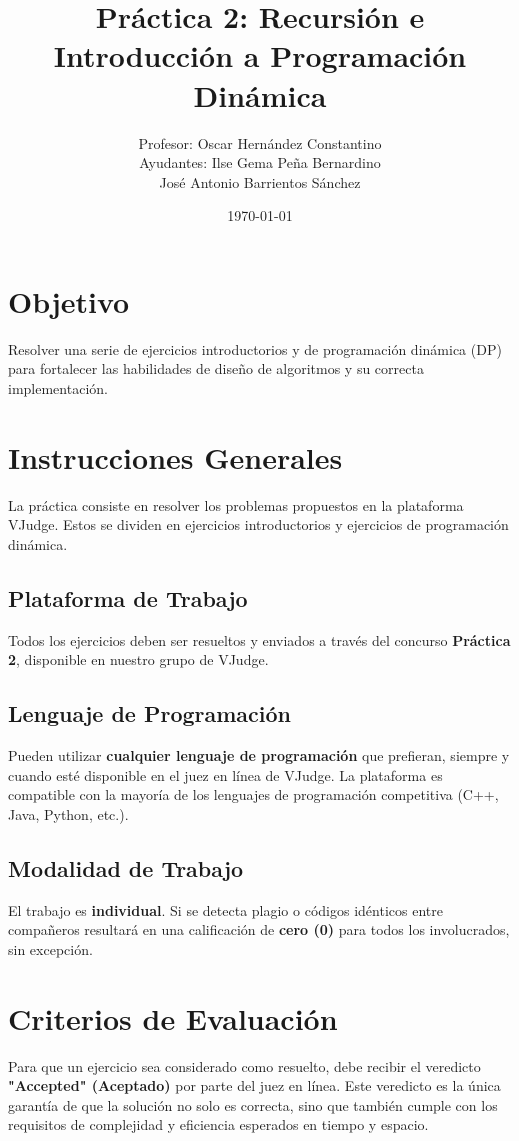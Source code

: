 \documentclass{article}
\title{\textbf{Práctica 2: Recursión e Introducción a Programación Dinámica}}
\author{Profesor: Oscar Hernández Constantino\\ Ayudantes: Ilse Gema Peña Bernardino \\ José Antonio Barrientos Sánchez}
\date{\today}
\begin{document}
\maketitle


\section*{Objetivo}
Resolver una serie de ejercicios introductorios y de programación dinámica (DP) para fortalecer las habilidades de diseño de algoritmos y su correcta implementación.

\section{Instrucciones Generales}

La práctica consiste en resolver los problemas propuestos en la plataforma VJudge. Estos se dividen en ejercicios introductorios y ejercicios de programación dinámica.

\subsection{Plataforma de Trabajo}
Todos los ejercicios deben ser resueltos y enviados a través del concurso \textbf{Práctica 2}, disponible en nuestro grupo de VJudge. 

\subsection{Lenguaje de Programación}
Pueden utilizar \textbf{cualquier lenguaje de programación} que prefieran, siempre y cuando esté disponible en el juez en línea de VJudge. La plataforma es compatible con la mayoría de los lenguajes de programación competitiva (C++, Java, Python, etc.).

\subsection{Modalidad de Trabajo}
El trabajo es \textbf{individual}. Si se detecta plagio o códigos idénticos entre compañeros resultará en una calificación de \textbf{cero (0)} para todos los involucrados, sin excepción.

\section{Criterios de Evaluación}
Para que un ejercicio sea considerado como resuelto, debe recibir el veredicto \textbf{"Accepted" (Aceptado)} por parte del juez en línea. Este veredicto es la única garantía de que la solución no solo es correcta, sino que también cumple con los requisitos de complejidad y eficiencia esperados en tiempo y espacio.
\end{document}
